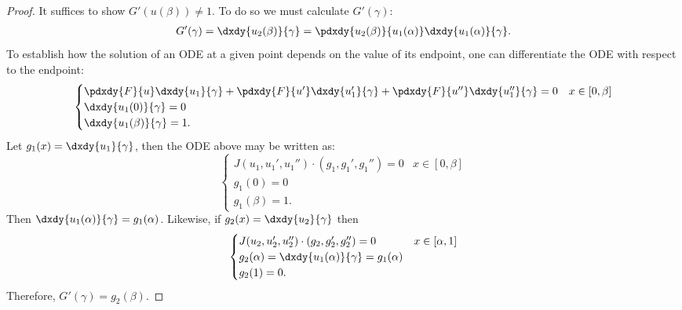 \documentclass{book}
\begin{document}
\begin{proof}
It suffices to show $G'(u(\beta)) \neq 1$.
To do so we must calculate $G'(\gamma)$:
\begin{align*}
G'(\gamma) = \dxdy{u_2(\beta)}{\gamma} = \pdxdy{u_2(\beta)}{u_1(\alpha)} \dxdy{u_1(\alpha)}{\gamma} .
\end{align*}
To establish how the solution of an ODE at a given point depends on the value of its endpoint, one can differentiate the ODE with respect to the endpoint:
\begin{align*}
\begin{cases} \pdxdy{F}{u} \dxdy{u_1}{\gamma} + \pdxdy{F}{u'} \dxdy{u_1'}{\gamma} + \pdxdy{F}{u''} \dxdy{u_1''}{\gamma} = 0 & x \in [0,\beta] \\
\dxdy{u_1(0)}{\gamma} = 0 \\
\dxdy{u_1(\beta)}{\gamma} = 1. \end{cases}
\end{align*}
Let $g_1(x) = \dxdy{u_1}{\gamma}$, then the ODE above may be written as:
\begin{equation*}
\begin{cases} J(u_1,u_1',u_1'') \cdot (g_1, g_1', g_1'') = 0 & x \in [0,\beta] \\ g_1(0) = 0 \\ g_1(\beta) = 1. \end{cases}
\end{equation*}
Then $\dxdy{u_1(\alpha)}{\gamma} = g_1(\alpha)$.
Likewise, if $g_2(x) = \dxdy{u_2}{\gamma}$ then
\begin{equation*}
\begin{cases} J(u_2,u_2',u_2'') \cdot (g_2, g_2', g_2'') = 0 & x \in [\alpha,1] \\
g_2(\alpha) = \dxdy{u_1(\alpha)}{\gamma} = g_1(\alpha) \\ g_2(1) = 0 . \end{cases}
\end{equation*}
Therefore, $G'(\gamma) = g_2(\beta)$.


\end{proof}
\end{document}
